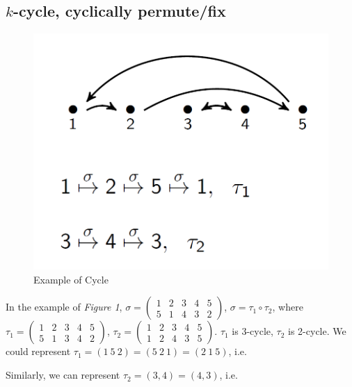 \documentclass[11pt]{elegantbook}
\begin{document}
\subsection{$k$-cycle, cyclically permute/fix}
\begin{example}
\end{example}
\begin{center}
\begin{figure}[htbp]
    \centering
    \includegraphics[scale=0.5]{Cycle.png}
    \caption{Example of Cycle}
\end{figure}
\end{center}
In the example of \textit{Figure 1}, $\sigma=\begin{pmatrix}
    1&2&3&4&5\\
    5&1&4&3&2
\end{pmatrix}$, $\sigma=\tau_1\circ\tau_2$, where $\tau_1=\begin{pmatrix}
    1&2&3&4&5\\
    5&1&3&4&2
\end{pmatrix}$, $\tau_2=\begin{pmatrix}
    1&2&3&4&5\\
    1&2&4&3&5
\end{pmatrix}$. $\tau_1$ is 3-cycle, $\tau_2$ is 2-cycle.
We could represent $\tau_1=(1\ 5\ 2)=(5\ 2\ 1)=(2\ 1\ 5)$, i.e.
Similarly, we can represent $\tau_2=(3,4)=(4,3)$, i.e.
\end{document}
